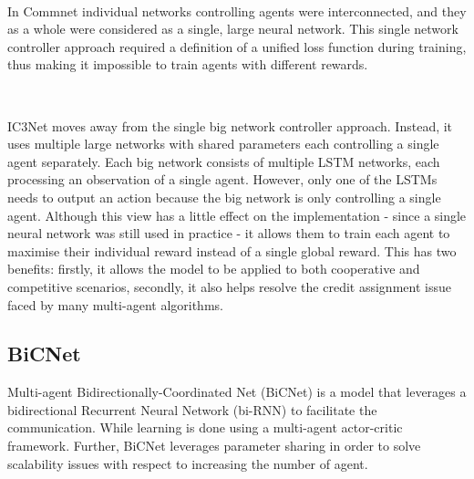 \documentclass{article}
\begin{document}
\

In Commnet \citep{sukhbaatar2016commnet} individual networks controlling agents were interconnected, and they as a whole were considered as a single, large neural network. This single network controller approach required a definition of a unified loss function during training, thus making it impossible to train agents with different rewards. 

\

IC3Net \citep{singh2018ic3net} moves away from the single big network controller approach. Instead, it uses multiple large networks with shared parameters each controlling a single agent separately. Each big network consists of multiple LSTM networks, each processing an observation of a single agent. However, only one of the LSTMs needs to output an action because the big network is only controlling a single agent. Although this view has a little effect on the implementation - since a single neural network was still used in practice - it allows them to train each agent to maximise their individual reward instead of a single global reward. This has two benefits: firstly, it allows the model to be applied to both cooperative and competitive scenarios, secondly, it also helps resolve the credit assignment issue faced by many multi-agent algorithms. 

\subsection{BiCNet}

Multi-agent Bidirectionally-Coordinated Net (BiCNet) \citep{peng2017bicnet} is a model that leverages a bidirectional Recurrent Neural Network (bi-RNN) \citep{chuster1997Bidirectional} to facilitate the communication. While learning is done using a multi-agent actor-critic framework. Further, BiCNet \citep{peng2017bicnet} leverages parameter sharing in order to solve scalability issues with respect to increasing the number of agent.

\
\end{document}
